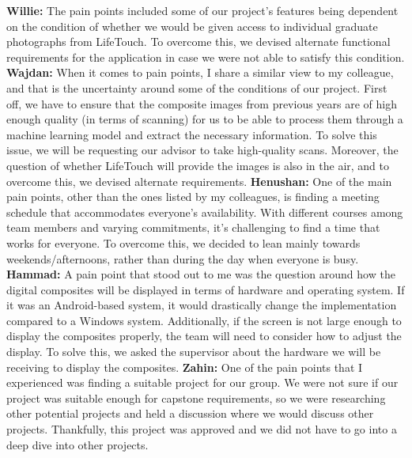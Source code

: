 \documentclass{article}
\begin{document}
\textbf{Willie:}  
The pain points included some of our project’s features being dependent on the condition of whether we would be given access to individual graduate photographs from LifeTouch. To overcome this, we devised alternate functional requirements for the application in case we were not able to satisfy this condition.
\newline
\newline
\textbf{Wajdan:}  
When it comes to pain points, I share a similar view to my colleague, and that is the uncertainty around some of the conditions of our project. First off, we have to ensure that the composite images from previous years are of high enough quality (in terms of scanning) for us to be able to process them through a machine learning model and extract the necessary information. To solve this issue, we will be requesting our advisor to take high-quality scans. Moreover, the question of whether LifeTouch will provide the images is also in the air, and to overcome this, we devised alternate requirements.
\newline
\newline
\textbf{Henushan:}  
One of the main pain points, other than the ones listed by my colleagues, is finding a meeting schedule that accommodates everyone's availability. With different courses among team members and varying commitments, it’s challenging to find a time that works for everyone. To overcome this, we decided to lean mainly towards weekends/afternoons, rather than during the day when everyone is busy.
\newline
\newline
\textbf{Hammad:}  
A pain point that stood out to me was the question around how the digital composites will be displayed in terms of hardware and operating system. If it was an Android-based system, it would drastically change the implementation compared to a Windows system. Additionally, if the screen is not large enough to display the composites properly, the team will need to consider how to adjust the display. To solve this, we asked the supervisor about the hardware we will be receiving to display the composites.
\newline
\newline
\textbf{Zahin:}  
\newline
One of the pain points that I experienced was finding a suitable project for our group. We were not sure if our project was suitable enough for capstone requirements, so we were researching other potential projects and held a discussion where we would discuss other projects. Thankfully, this project was approved and we did not have to go into a deep dive into other projects.
\end{document}
